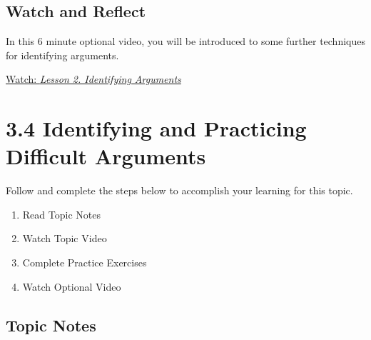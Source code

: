 \documentclass[
]{book}
\providecommand{\tightlist}{%
  \setlength{\itemsep}{0pt}\setlength{\parskip}{0pt}}
\begin{document}
\begin{reflect}
\end{reflect}

\hypertarget{watch-and-reflect-19}{%
\subsection*{Watch and Reflect}\label{watch-and-reflect-19}}

\begin{reflect}
In this 6 minute optional video, you will be introduced to some further techniques for identifying arguments.

\href{https://www.youtube.com/watch?v=lYiEj5z8le8}{Watch: \emph{Lesson 2. Identifying Arguments}}
\end{reflect}

\hypertarget{identifying-and-practicing-difficult-arguments}{%
\section*{3.4 Identifying and Practicing Difficult Arguments}\label{identifying-and-practicing-difficult-arguments}}

Follow and complete the steps below to accomplish your learning for this topic.

\begin{enumerate}
\def\labelenumi{\arabic{enumi}.}
\tightlist
\item
  Read Topic Notes
\item
  Watch Topic Video
\item
  Complete Practice Exercises
\item
  Watch Optional Video
\end{enumerate}

\hypertarget{topic-notes-11}{%
\subsection*{Topic Notes}\label{topic-notes-11}}
\end{document}
